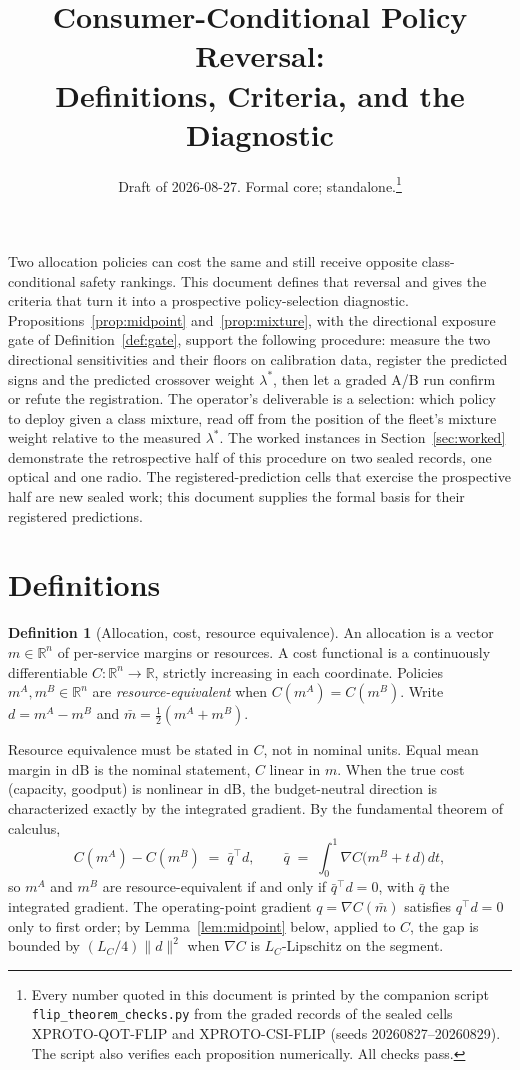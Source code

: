 \documentclass[11pt]{article}
\title{Consumer-Conditional Policy Reversal:\\ Definitions, Criteria, and the Diagnostic}
\author{}
\date{Draft of 2026-08-27. Formal core; standalone.\thanks{Every number quoted
in this document is printed by the companion script
\texttt{flip\_theorem\_checks.py} from the graded records of the sealed cells
XPROTO-QOT-FLIP and XPROTO-CSI-FLIP (seeds 20260827--20260829). The script
also verifies each proposition numerically. All checks pass.}}
\theoremstyle{definition}
\newtheorem{definition}{Definition}
\theoremstyle{remark}
\newcommand{\R}{\mathbb{R}}
\newcommand{\mbar}{\bar{m}}
\newcommand{\lamstar}{\lambda^{*}}
\begin{document}
\maketitle

\noindent
Two allocation policies can cost the same and still receive opposite
class-conditional safety rankings. This document defines that reversal and
gives the criteria that turn it into a prospective policy-selection
diagnostic. Propositions~\ref{prop:midpoint} and~\ref{prop:mixture}, with the
directional exposure gate of Definition~\ref{def:gate}, support the following
procedure: measure the two directional sensitivities and their floors on
calibration data, register the predicted signs and the predicted crossover
weight $\lamstar$, then let a graded A/B run confirm or refute the
registration. The operator's deliverable is a selection: which policy to
deploy given a class mixture, read off from the position of the fleet's
mixture weight relative to the measured $\lamstar$. The worked instances in
Section~\ref{sec:worked} demonstrate the retrospective half of this procedure
on two sealed records, one optical and one radio. The registered-prediction
cells that exercise the prospective half are new sealed work; this document
supplies the formal basis for their registered predictions.

\section{Definitions}\label{sec:defs}

\begin{definition}[Allocation, cost, resource equivalence]\label{def:cost}
An allocation is a vector $m \in \R^n$ of per-service margins or resources.
A cost functional is a continuously differentiable $C:\R^n \to \R$, strictly
increasing in each coordinate. Policies $m^A, m^B \in \R^n$ are
\emph{resource-equivalent} when $C(m^A) = C(m^B)$. Write $d = m^A - m^B$ and
$\mbar = \tfrac12(m^A + m^B)$.
\end{definition}

Resource equivalence must be stated in $C$, not in nominal units. Equal mean
margin in dB is the nominal statement, $C$ linear in $m$. When the true cost
(capacity, goodput) is nonlinear in dB, the budget-neutral direction is
characterized exactly by the integrated gradient. By the fundamental theorem
of calculus,
\begin{equation}\label{eq:ftc}
C(m^A) - C(m^B) \;=\; \bar q^{\top} d,
\qquad
\bar q \;=\; \int_0^1 \nabla C\bigl(m^B + t\,d\bigr)\,dt ,
\end{equation}
so $m^A$ and $m^B$ are resource-equivalent if and only if $\bar q^{\top} d =
0$, with $\bar q$ the integrated gradient. The operating-point gradient $q =
\nabla C(\mbar)$ satisfies $q^{\top} d = 0$ only to first order; by
Lemma~\ref{lem:midpoint} below, applied to $C$, the gap is bounded by
$(L_C/4)\|d\|^2$ when $\nabla C$ is $L_C$-Lipschitz on the segment.
\end{document}

